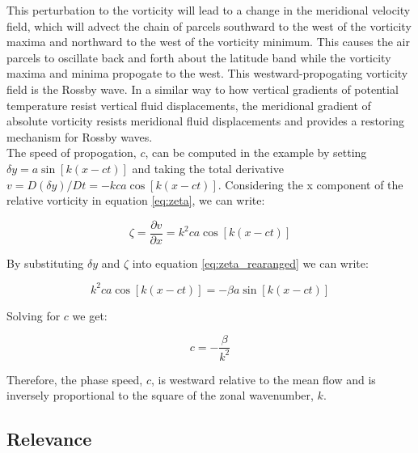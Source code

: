 \documentclass{article}
\begin{document}

This perturbation to the vorticity will lead to a change in the meridional velocity field, which will advect the chain of parcels southward to the west of the vorticity maxima and northward to the west of the vorticity minimum. This causes the air parcels to oscillate back and forth about the latitude band while the vorticity maxima and minima propogate to the west. This westward-propogating vorticity field is the Rossby wave. In a similar way to how vertical gradients of potential temperature resist vertical fluid displacements, the meridional gradient of absolute vorticity resists meridional fluid displacements and provides a restoring mechanism for Rossby waves.\\

The speed of propogation, $c$, can be computed in the example by setting $\delta y = a \sin[k(x - ct)]$ and taking the total derivative $v = D(\delta y)/Dt = -kca \cos[k(x - ct)]$. Considering the x component of the relative vorticity in equation \ref{eq:zeta}, we can write:

\begin{equation}
    \zeta  = \frac{\partial v}{\partial x} = k^2 ca \cos[k(x - ct)]
    \label{eq:zeta_x}
\end{equation}

By substituting $\delta y$ and $\zeta$ into equation \ref*{eq:zeta_rearanged} we can write:

\begin{equation}
    k^2 ca \cos[k(x - ct)] = -\beta a \sin[k(x - ct)]
    \label{eq:zeta_x_substitution}
\end{equation}

Solving for $c$ we get:

\begin{equation}
    c = -\frac{\beta}{k^2}
    \label{eq:zeta_x_substitution_c}
\end{equation}

Therefore, the phase speed, $c$, is westward relative to the mean flow and is inversely proportional to the square of the zonal wavenumber, $k$.\\


\subsection*{Relevance}

 
\end{document}
